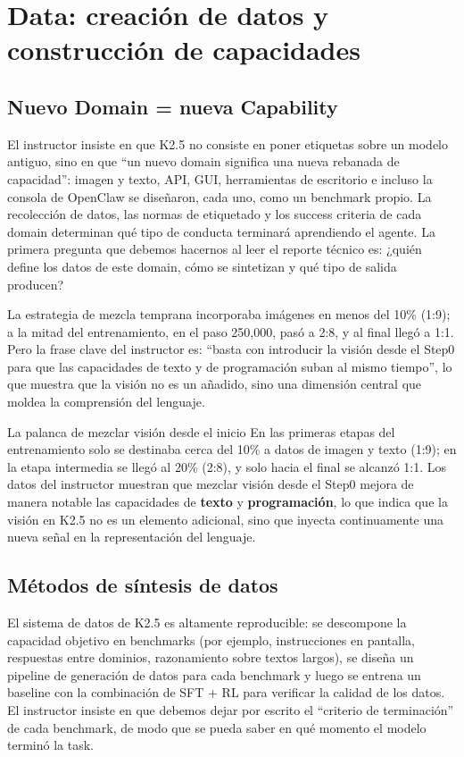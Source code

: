 \section{Data: creación de datos y construcción de capacidades}

\subsection{Nuevo Domain = nueva Capability}
El instructor insiste en que K2.5 no consiste en poner etiquetas sobre un modelo antiguo, sino en que ``un nuevo domain significa una nueva rebanada de capacidad'': imagen y texto, API, GUI, herramientas de escritorio e incluso la consola de OpenClaw se diseñaron, cada uno, como un benchmark propio. La recolección de datos, las normas de etiquetado y los success criteria de cada domain determinan qué tipo de conducta terminará aprendiendo el agente. La primera pregunta que debemos hacernos al leer el reporte técnico es: ¿quién define los datos de este domain, cómo se sintetizan y qué tipo de salida producen?

La estrategia de mezcla temprana incorporaba imágenes en menos del 10\% (1:9); a la mitad del entrenamiento, en el paso 250,000, pasó a 2:8, y al final llegó a 1:1. Pero la frase clave del instructor es: ``basta con introducir la visión desde el Step0 para que las capacidades de texto y de programación suban al mismo tiempo'', lo que muestra que la visión no es un añadido, sino una dimensión central que moldea la comprensión del lenguaje.

\begin{importantbox}{La palanca de mezclar visión desde el inicio}
En las primeras etapas del entrenamiento solo se destinaba cerca del 10\% a datos de imagen y texto (1:9); en la etapa intermedia se llegó al 20\% (2:8), y solo hacia el final se alcanzó 1:1. Los datos del instructor muestran que mezclar visión desde el Step0 mejora de manera notable las capacidades de \textbf{texto} y \textbf{programación}, lo que indica que la visión en K2.5 no es un elemento adicional, sino que inyecta continuamente una nueva señal en la representación del lenguaje.
\end{importantbox}

\subsection{Métodos de síntesis de datos}
El sistema de datos de K2.5 es altamente reproducible: se descompone la capacidad objetivo en benchmarks (por ejemplo, instrucciones en pantalla, respuestas entre dominios, razonamiento sobre textos largos), se diseña un pipeline de generación de datos para cada benchmark y luego se entrena un baseline con la combinación de SFT + RL para verificar la calidad de los datos. El instructor insiste en que debemos dejar por escrito el ``criterio de terminación'' de cada benchmark, de modo que se pueda saber en qué momento el modelo terminó la task.

